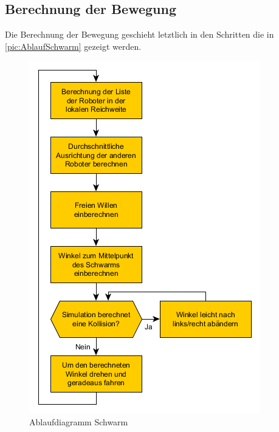 \subsection*{Berechnung der Bewegung}

Die Berechnung der Bewegung geschieht letztlich in den Schritten die in \autoref{pic:AblaufSchwarm} gezeigt werden.

\begin{figure}
	\includegraphics[width=\pictureWidth,keepaspectratio]{graphics/ImplSchwarm.png}
	\caption{Ablaufdiagramm Schwarm}
	\label{pic:AblaufSchwarm}
\end{figure}










